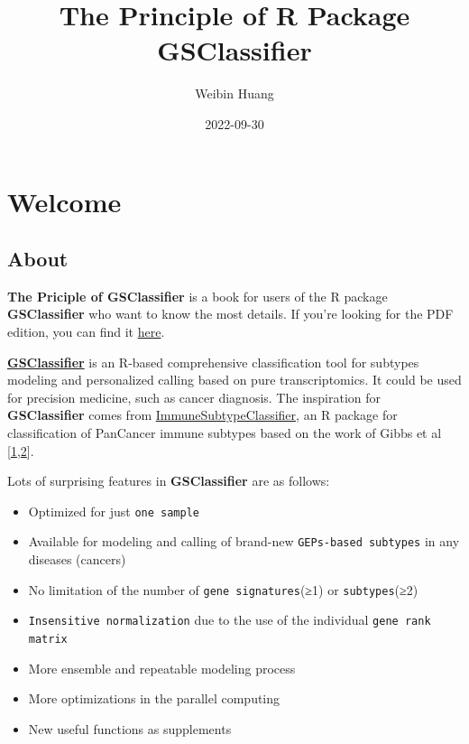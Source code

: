 \documentclass[
  12pt,
]{book}
\title{The Principle of R Package GSClassifier}
\author{Weibin Huang}
\date{2022-09-30}
\newcommand{\passthrough}[1]{#1}
\begin{document}
\maketitle

{
\hypersetup{linkcolor=}
\setcounter{tocdepth}{2}
\tableofcontents
}
\hypertarget{welcome}{%
\chapter*{Welcome}\label{welcome}}

\hypertarget{about}{%
\section*{About}\label{about}}

\textbf{The Priciple of GSClassifier} is a book for users of the R package \textbf{GSClassifier} who want to know the most details. If you're looking for the PDF edition, you can find it \href{https://github.com/huangwb8/GSClassifier.principle/blob/master/docs/GSClassifier.principle.pdf}{here}.

\href{https://github.com/huangwb8/GSClassifier}{\textbf{GSClassifier}} is an R-based comprehensive classification tool for subtypes modeling and personalized calling based on pure transcriptomics. It could be used for precision medicine, such as cancer diagnosis. The inspiration for \textbf{GSClassifier} comes from \href{https://github.com/CRI-iAtlas/ImmuneSubtypeClassifier}{ImmuneSubtypeClassifier}, an R package for classification of PanCancer immune subtypes based on the work of Gibbs et al {[}\protect\hyperlink{ref-RN160}{1},\protect\hyperlink{ref-RN315}{2}{]}.

Lots of surprising features in \textbf{GSClassifier} are as follows:

\begin{itemize}
\item
  Optimized for just \passthrough{\lstinline!one sample!}
\item
  Available for modeling and calling of brand-new \passthrough{\lstinline!GEPs-based subtypes!} in any diseases (cancers)
\item
  No limitation of the number of \passthrough{\lstinline!gene signatures!}(≥1) or \passthrough{\lstinline!subtypes!}(≥2)
\item
  \passthrough{\lstinline!Insensitive normalization!} due to the use of the individual \passthrough{\lstinline!gene rank matrix!}
\item
  More ensemble and repeatable modeling process
\item
  More optimizations in the parallel computing
\item
  New useful functions as supplements
\end{itemize}
\end{document}
